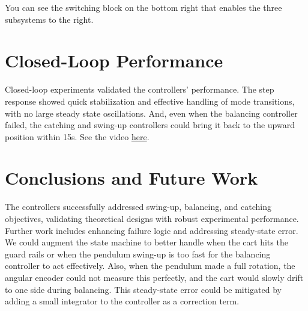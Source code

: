 \documentclass[12pt]{article}
\begin{document}
You can see the switching block on the bottom right that enables the three subsystems to the right.
\section{Closed-Loop Performance}

Closed-loop experiments validated the controllers' performance. The step response showed quick stabilization and effective handling of mode transitions, with no large steady state oscillations. And, even when the balancing controller failed, the catching and swing-up controllers could bring it back to the upward position within 15s. 
See the video \href{https://youtu.be/cFawTXDfmD8}{here}.



\section{Conclusions and Future Work}
The controllers successfully addressed swing-up, balancing, and catching objectives, validating theoretical designs with robust experimental performance. Further work includes enhancing failure logic and addressing steady-state error. 
We could augment the state machine to better handle when the cart hits the guard rails or when the pendulum swing-up is too fast for the balancing controller to act effectively.
Also, when the pendulum made a full rotation, the angular encoder could not measure this perfectly, and the cart would slowly drift to one side during balancing.
This steady-state error could be mitigated by adding a small integrator to the controller as a correction term.


% 
% 
\end{document}
